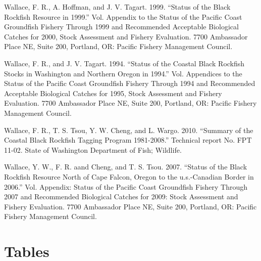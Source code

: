 \documentclass[11pt,
  english,
  letterpaper,
]{article}
\newlength{\cslhangindent}
\newenvironment{CSLReferences}[2] %
 {%
  \setlength{\parindent}{0pt}
  \ifodd #1 \everypar{\setlength{\hangindent}{\cslhangindent}}\ignorespaces\fi
  \ifnum #2 > 0
  \setlength{\parskip}{#2\baselineskip}
  \fi
 }%
 {}
\begin{document}
\begin{CSLReferences}{1}{0}
\leavevmode{}%
Wallace, F. R., A. Hoffman, and J. V. Tagart. 1999. {``Status of the Black Rockfish Resource in 1999.''} Vol. Appendix to the Status of the Pacific Coast Groundfish Fishery Through 1999 and Recommended Acceptable Biological Catches for 2000, Stock Assessment and Fishery Evaluation. 7700 Ambassador Place NE, Suite 200, Portland, OR: Pacific Fishery Management Council.

\leavevmode{}%
Wallace, F. R., and J. V. Tagart. 1994. {``Status of the Coastal Black Rockfish Stocks in Washington and Northern Oregon in 1994.''} Vol. Appendices to the Status of the Pacific Coast Groundfish Fishery Through 1994 and Recommended Acceptable Biological Catches for 1995, Stock Assessment and Fishery Evaluation. 7700 Ambassador Place NE, Suite 200, Portland, OR: Pacific Fishery Management Council.

\leavevmode{}%
Wallace, F. R., T. S. Tsou, Y. W. Cheng, and L. Wargo. 2010. {``Summary of the Coastal Black Rockfish Tagging Program 1981-2008.''} Technical report No. FPT 11-02. State of Washington Department of Fish; Wildlife.

\leavevmode{}%
Wallace, Y. W., F. R. aand Cheng, and T. S. Tsou. 2007. {``Status of the Black Rockfish Resource North of Cape Falcon, Oregon to the u.s.-Canadian Border in 2006.''} Vol. Appendix: Status of the Pacific Coast Groundfish Fishery Through 2007 and Recommended Biological Catches for 2009: Stock Assessment and Fishery Evaluation. 7700 Ambassador Place NE, Suite 200, Portland, OR: Pacific Fishery Management Council.

\end{CSLReferences}

\clearpage

\hypertarget{tables}{%
\section{Tables}\label{tables}}







\newpage

\begingroup\fontsize{9}{11}\selectfont
\end{document}
